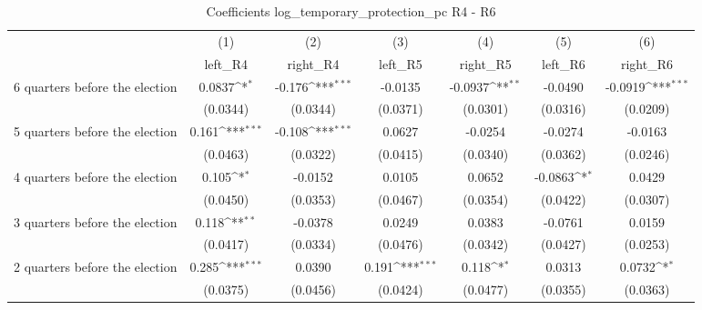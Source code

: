 \begin{table}[htbp]\centering
\def\sym#1{\ifmmode^{#1}\else\(^{#1}\)\fi}
\caption{Coefficients log\_temporary\_protection\_pc R4 - R6}
\begin{tabular}{l*{6}{c}}
\hline\hline
                    &\multicolumn{1}{c}{(1)}&\multicolumn{1}{c}{(2)}&\multicolumn{1}{c}{(3)}&\multicolumn{1}{c}{(4)}&\multicolumn{1}{c}{(5)}&\multicolumn{1}{c}{(6)}\\
                    &\multicolumn{1}{c}{left\_R4}&\multicolumn{1}{c}{right\_R4}&\multicolumn{1}{c}{left\_R5}&\multicolumn{1}{c}{right\_R5}&\multicolumn{1}{c}{left\_R6}&\multicolumn{1}{c}{right\_R6}\\
\hline
 6 quarters before the election&      0.0837\sym{*}  &      -0.176\sym{***}&     -0.0135         &     -0.0937\sym{**} &     -0.0490         &     -0.0919\sym{***}\\
                    &    (0.0344)         &    (0.0344)         &    (0.0371)         &    (0.0301)         &    (0.0316)         &    (0.0209)         \\
[1em]
 5 quarters before the election&       0.161\sym{***}&      -0.108\sym{***}&      0.0627         &     -0.0254         &     -0.0274         &     -0.0163         \\
                    &    (0.0463)         &    (0.0322)         &    (0.0415)         &    (0.0340)         &    (0.0362)         &    (0.0246)         \\
[1em]
 4 quarters before the election&       0.105\sym{*}  &     -0.0152         &      0.0105         &      0.0652         &     -0.0863\sym{*}  &      0.0429         \\
                    &    (0.0450)         &    (0.0353)         &    (0.0467)         &    (0.0354)         &    (0.0422)         &    (0.0307)         \\
[1em]
 3 quarters before the election&       0.118\sym{**} &     -0.0378         &      0.0249         &      0.0383         &     -0.0761         &      0.0159         \\
                    &    (0.0417)         &    (0.0334)         &    (0.0476)         &    (0.0342)         &    (0.0427)         &    (0.0253)         \\
[1em]
 2 quarters before the election&       0.285\sym{***}&      0.0390         &       0.191\sym{***}&       0.118\sym{*}  &      0.0313         &      0.0732\sym{*}  \\
                    &    (0.0375)         &    (0.0456)         &    (0.0424)         &    (0.0477)         &    (0.0355)         &    (0.0363)         \\

\end{tabular}
\end{table}
